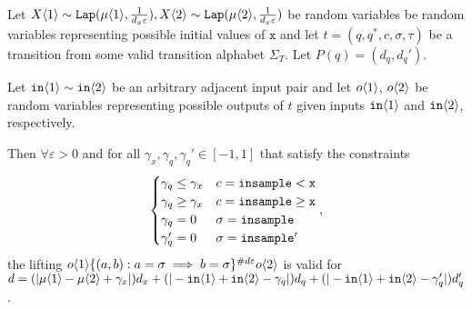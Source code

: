 \begin{lemma}\label{indTransitionCoupling}
    Let $X\brangle{1}\sim \Lap(\mu\brangle{1}, \frac{1}{d_x\varepsilon}), X\brangle{2}\sim\Lap(\mu\brangle{2}, \frac{1}{d_x\varepsilon})$ be random variables be random variables representing possible initial values of $\texttt{x}$ and let $t = (q, q^*, c, \sigma, \tau)$ be a transition from some valid transition alphabet $\Sigma_T$.
    Let $P(q) = (d_q, d_q')$.

    Let $\texttt{in}\brangle{1}\sim \texttt{in}\brangle{2}$ be an arbitrary adjacent input pair and let $o\brangle{1}$, $o\brangle{2}$ be random variables representing possible outputs of $t$ given inputs $\texttt{in}\brangle{1}$ and $\texttt{in}\brangle{2}$, respectively. 

    Then $\forall \varepsilon>0$ and for all $\gamma_x, \gamma_q, \gamma_q'\in [-1, 1]$ that satisfy the constraints \[
        \begin{cases}
          \gamma_q\leq\gamma_x & c = \lguard[\texttt{x}]\\
          \gamma_q\geq\gamma_x & c = \gguard[\texttt{x}]\\
          \gamma_q=0 & \sigma = \texttt{insample}\\
          \gamma_q'=0 & \sigma = \texttt{insample}'
        \end{cases},
      \]
      the lifting $o\brangle{1}\{(a, b): a=\sigma\implies b=\sigma\}^{\#d\varepsilon}o\brangle{2}$ is valid for $d = (|\mu\brangle{1}-\mu\brangle{2}+\gamma_x|)d_x+(|-\texttt{in}\brangle{1}+\texttt{in}\brangle{2}-\gamma_q|)d_q+(|-\texttt{in}\brangle{1}+\texttt{in}\brangle{2}-\gamma_q'|)d_q'$.
\end{lemma}

